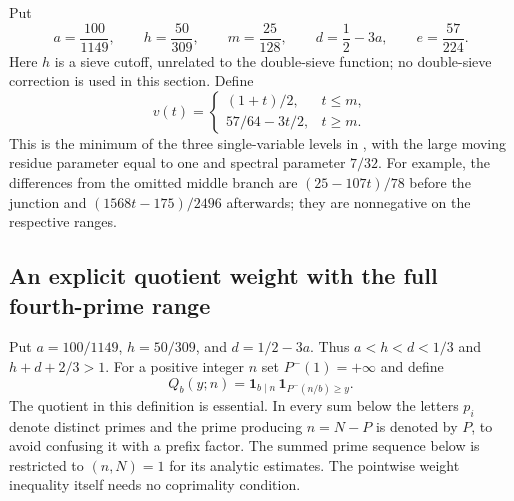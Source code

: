 \documentclass[11pt]{article}
\begin{document}
Put
\[
 a=\frac{100}{1149},\qquad h=\frac{50}{309},\qquad
 m=\frac{25}{128},\qquad d=\frac12-3a,\qquad e=\frac{57}{224}.
\]
Here $h$ is a sieve cutoff, unrelated to the double-sieve function; no
double-sieve correction is used in this section. Define
\[
 v(t)=\begin{cases}(1+t)/2,&t\le m,\\
                    57/64-3t/2,&t\ge m.
       \end{cases}
\]
This is the minimum of the three single-variable levels in
\cite[Proposition 6.1]{Lichtman2023}, with the large moving residue
parameter equal to one and spectral parameter $7/32$.
For example, the differences from the omitted middle branch are
$(25-107t)/78$ before the junction and $(1568t-175)/2496$ afterwards;
they are nonnegative on the respective ranges.


\subsection{An explicit quotient weight with the full fourth-prime range}
\label{sec:repaired-chen-weight}

Put $a=100/1149$, $h=50/309$, and $d=1/2-3a$.
Thus $a<h<d<1/3$ and $h+d+2/3>1$.
For a positive integer $n$ set $P^-(1)=+\infty$ and define
\[
 Q_b(y;n)=\mathbf 1_{b\mid n}\,
          \mathbf 1_{P^-(n/b)\ge y}.
\]
The quotient in this definition is essential. In every sum below the
letters $p_i$ denote distinct primes and the prime producing
$n=N-P$ is denoted by $P$, to avoid confusing it with a prefix factor.
The summed prime sequence below is restricted to $(n,N)=1$ for its
analytic estimates. The pointwise weight inequality itself needs no
coprimality condition.
\end{document}
